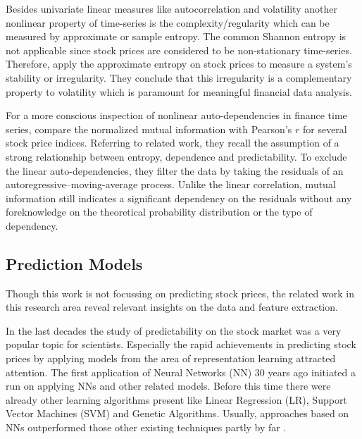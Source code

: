 Besides univariate linear measures like autocorrelation and volatility another nonlinear property of time-series is the complexity/regularity which can be measured by approximate or sample entropy. The common Shannon entropy is not applicable since stock prices are considered to be non-stationary time-series. Therefore, \citet{Pincus2004IrregularitySeries} apply the approximate entropy on stock prices to measure a system's stability or irregularity. They conclude that this irregularity is a complementary property to volatility which is paramount for meaningful financial data analysis.

For a more conscious inspection of nonlinear auto-dependencies in finance time series, \citet{Dionisio2004MutualSeries} compare the normalized mutual information with Pearson's $r$ for several stock price indices. Referring to related work, they recall the assumption of a strong relationship between entropy, dependence and predictability. To exclude the linear auto-dependencies, they filter the data by taking the residuals of an autoregressive–moving-average process. Unlike the linear correlation, mutual information still indicates a significant dependency on the residuals without any foreknowledge on the theoretical probability distribution or the type of dependency.




\subsection{Prediction Models}

Though this work is not focussing on predicting stock prices, the related work in this research area reveal relevant insights on the data and feature extraction. 

In the last decades the study of predictability on the stock market was a very popular topic for scientists. Especially the rapid achievements in predicting stock prices by applying models from the area of representation learning attracted attention. The first application of Neural Networks (NN) 30 years ago initiated a run on applying NNs and other related models. Before this time there were already other learning algorithms present like Linear Regression (LR), Support Vector Machines (SVM) and Genetic Algorithms. Usually, approaches based on NNs outperformed those other existing techniques partly by far \cite{Hsu2016BridgingEconomists, Yoo2005MachineEvaluation}.

